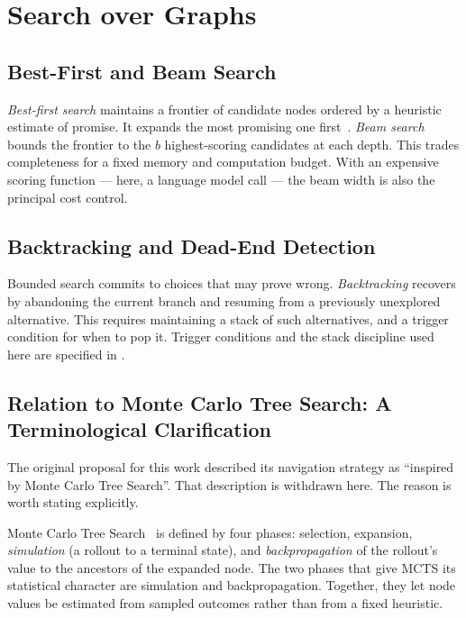 \section{Search over Graphs}\label{sec:search}

\subsection{Best-First and Beam Search}

\emph{Best-first search} maintains a frontier of
candidate nodes ordered by a heuristic estimate of promise. It expands the most
promising one first~\cite{hart1968formal,pearl1984heuristics}. \emph{Beam
search} bounds the frontier to the $b$ highest-scoring candidates at each
depth. This trades completeness for a fixed memory and computation budget.
With an expensive scoring function --- here, a language model call --- the
beam width is also the principal cost control.

\subsection{Backtracking and Dead-End Detection}

Bounded search commits to choices that may prove wrong.
\emph{Backtracking} recovers by abandoning the current
branch and resuming from a previously unexplored alternative. This requires
maintaining a stack of such alternatives, and a trigger condition for when to
pop it. Trigger conditions and the stack discipline used here are specified in
.

\subsection{Relation to Monte Carlo Tree Search: A Terminological
Clarification}\label{sec:mcts-clarification}

The original proposal for this work described its navigation strategy
as ``inspired by Monte Carlo Tree Search''. That
description is withdrawn here. The reason is worth stating explicitly.

Monte Carlo Tree Search~\cite{kocsis2006bandit,browne2012survey} is defined by
four phases: selection, expansion, \emph{simulation} (a rollout to a terminal
state), and \emph{backpropagation} of the rollout's value to the ancestors of
the expanded node. The two phases that give MCTS its statistical character are
simulation and backpropagation. Together, they let node values be estimated
from sampled outcomes rather than from a fixed heuristic.


